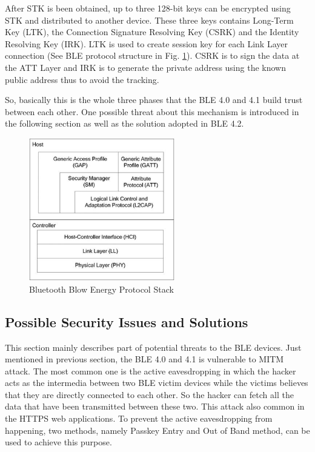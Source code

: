 \documentclass{cseminar}
\begin{document}
After STK is been obtained, up to three 128-bit keys can be encrypted using STK and distributed to another device. These three keys contains  Long-Term Key (LTK), the Connection Signature Resolving Key (CSRK) and the Identity Resolving Key (IRK). LTK is used to create session key for each Link Layer connection (See BLE protocol structure in Fig. \ref{BLE_protocol_stack}). CSRK is to sign the data at the ATT Layer and IRK is to generate the private address using the known public address thus to avoid the tracking.

So, basically this is the whole three phases that the BLE 4.0 and 4.1 build trust between each other. One possible threat about this mechanism is introduced in the following section as well as the solution adopted in BLE 4.2.
\begin{figure}
\centering
\includegraphics[width=2.5in]{figures/BLE_protocol_stack.jpg}
\caption{Bluetooth Blow Energy Protocol Stack}
\label{BLE_protocol_stack}
\end{figure}

\subsection{Possible Security Issues and Solutions}
This section mainly describes part of potential threats to the BLE devices. Just mentioned in previous section, the BLE 4.0 and 4.1 is vulnerable to MITM attack. The most common one is the active eavesdropping in which the hacker acts as the intermedia between two BLE victim devices while the victims believes that they are directly connected to each other. So the hacker can fetch all the data that have been transmitted between these two. This attack also common in the HTTPS web applications. To prevent the active eavesdropping from happening, two methods, namely Passkey Entry and Out of Band method, can be used to achieve this purpose.
\end{document}
